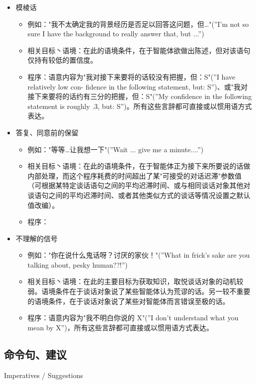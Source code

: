 \begin{itemize}
\item 模棱话
\begin{itemize}
\item 例如："我不太确定我的背景经历是否足以回答这问题，但…"(”I’m not so sure I have the background to really answer that, but ...”)
\item 相关目标丶语境：在此的语境条件，在于智能体欲做出陈述，但对该语句仅持有较低的置信度。
\item 程序：语意内容为"我对接下来要将的话较没有把握，但：S"(”I have relatively low con- fidence in the following statement, but: S”)、或"我对接下来要将的话约有三分的把握，但：S"(”My confidence in the following statement is roughly .3, but: S”)。所有这些言辞都可直接或以惯用语方式表达。
\end{itemize}
\item 答复、同意前的保留
\begin{itemize}
\item 例如："等等…让我想一下"(”Wait ... give me a minute....”)
\item 相关目标丶语境：在此的语境条件，在于智能体正为接下来所要说的话做内部处理，而这个程序耗费的时间超出了某"可接受的对话迟滞"参数值（可根据某特定谈话语句之间的平均迟滞时间、或与相同谈话对象其他对谈语句之间的平均迟滞时间、或者其他类似方式的谈话等情况设置之默认值改编）。 
\item 程序：
\end{itemize}


\item 不理解的信号
\begin{itemize}
\item 例如："你在说什么鬼话呀？讨厌的家伙！"(”What in frick’s sake are you talking about, pesky human??!”)
\item 相关目标丶语境：在此的主要目标为获取知识，取悦谈话对象的动机较弱。语境条件在于谈话对象说了某些智能体认为荒谬的话。另一较不重要的语境条件，在于谈话对象说了某些对智能体而言错误至极的话。
\item 程序：语意内容为"我不明白你说的 X"(”I don’t understand what you mean by X”)，所有这些言辞都可直接或以惯用语方式表达。
\end{itemize}

\end{itemize}

\subsection{命令句、建议}{Imperatives / Suggestions}

